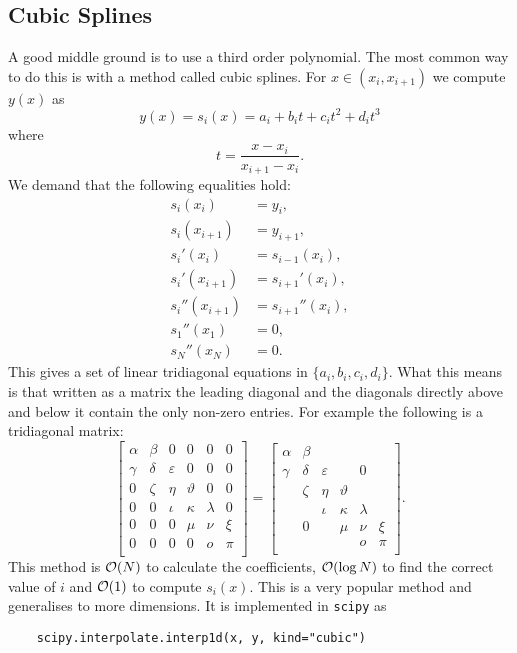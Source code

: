 \documentclass[a4paper]{article}
\begin{document}
    \subsection{Cubic Splines}
    A good middle ground is to use a third order polynomial.
    The most common way to do this is with a method called cubic splines.
    For \(x\in(x_i, x_{i+1})\) we compute \(y(x)\) as
    \[y(x) = s_i(x) = a_i + b_it + c_it^2 + d_it^3\]
    where
    \[t = \frac{x - x_i}{x_{i+1} - x_i}.\]
    We demand that the following equalities hold:
    \begin{align*}
        s_i(x_i) &= y_i,\\
        s_i(x_{i+1}) &= y_{i+1},\\
        s_i'(x_i) &= s_{i-1}(x_i),\\
        s_i'(x_{i+1}) &= s_{i+1}'(x_i),\\
        s_i''(x_{i+1}) &= s_{i+1}''(x_i),\\
        s_1''(x_1) &= 0,\\
        s_N''(x_N) &= 0.
    \end{align*}
    This gives a set of linear tridiagonal equations in \(\{a_i, b_i, c_i, d_i\}\).
    What this means is that written as a matrix the leading diagonal and the diagonals directly above and below it contain the only non-zero entries.
    For example the following is a tridiagonal matrix:
    \[
        \begin{bmatrix}
            \alpha & \beta & 0 & 0 & 0 & 0\\
            \gamma & \delta & \varepsilon & 0 & 0 & 0\\
            0 & \zeta & \eta & \vartheta & 0 & 0\\
            0 & 0 & \iota & \kappa & \lambda & 0\\
            0 & 0 & 0 & \mu & \nu & \xi\\
            0 & 0 & 0 & 0 & o & \pi\\
        \end{bmatrix}
        =
        \begin{bmatrix}
            \alpha & \beta &  &  &  & \\
            \gamma & \delta & \varepsilon &  & 0 & \\
             & \zeta & \eta & \vartheta &  & \\
             &  & \iota & \kappa & \lambda & \\
             & 0 &  & \mu & \nu & \xi\\
             &  &  &  & o & \pi\\
        \end{bmatrix}
        .
    \]
    This method is \(\order{N}\) to calculate the coefficients, \(\order{\log N}\) to find the correct value of \(i\) and \(\order{1}\) to compute \(s_i(x)\).
    This is a very popular method and generalises to more dimensions.
    It is implemented in \lstinline|scipy| as
    \begin{lstlisting}
    scipy.interpolate.interp1d(x, y, kind="cubic")
    \end{lstlisting}
\end{document}
